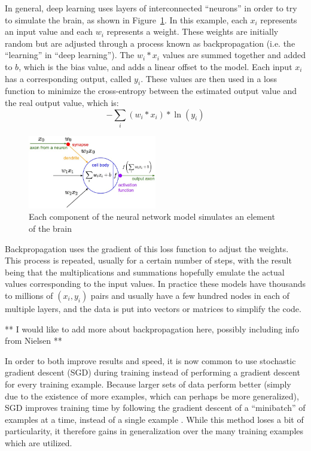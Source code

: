\documentclass[]{report}
\begin{document}
In general, deep learning uses layers of interconnected ``neurons'' in order to try to simulate the brain, as shown in Figure~\ref{neural-model}. In this example, each $x_{i}$ represents an input value and each $w_{i}$ represents a weight. These weights are initially random but are adjusted through a process known as backpropagation (i.e. the ``learning'' in ``deep learning''). The $w_{i}*x_{i}$ values are summed together and added to $b$, which is the bias value, and adds a linear offset to the model. Each input $x_{i}$ has a corresponding output, called $y_{i}$. These values are then used in a loss function to minimize the cross-entropy between the estimated output value and the real output value, which is: $$-\sum_{i} (w_{i}*x_{i})*\ln(y_{i}) $$
\begin{figure}
	\centering
	\includegraphics[width=0.5\textwidth]{../images/neuron_model}
	\caption{Each component of the neural network model simulates an element of the brain \cite{karpathy}}
	\label{neural-model}
\end{figure}

Backpropagation uses the gradient of this loss function to adjust the weights. This process is repeated, usually for a certain number of steps, with the result being that the multiplications and summations hopefully emulate the actual values corresponding to the input values. In practice these models have thousands to millions of $(x_{i}, y_{i})$ pairs and usually have a few hundred nodes in each of multiple layers, and the data is put into vectors or matrices to simplify the code. 

** I would like to add more about backpropagation here, possibly including info from Nielsen **


In order to both improve results and speed, it is now common to use stochastic gradient descent (SGD) during training instead of performing a gradient descent for every training example. Because larger sets of data perform better (simply due to the existence of more examples, which can perhaps be more generalized), SGD improves training time by following the gradient descent of a ``minibatch'' of examples at a time, instead of a single example \cite{Goodfellow-et-al-2016,ThreeGiants}. While this method loses a bit of particularity, it therefore gains in generalization over the many training examples which are utilized.
\end{document}
